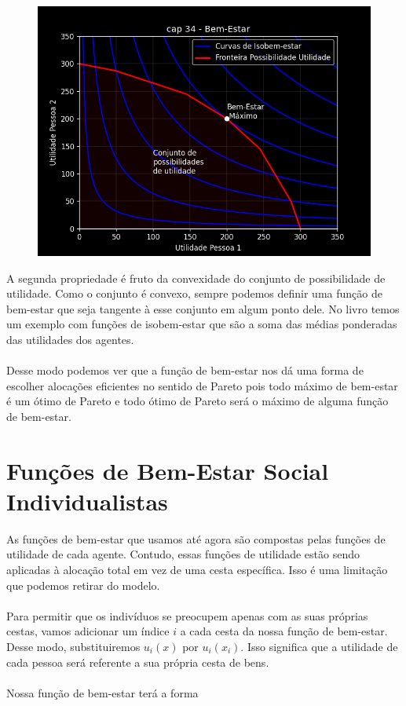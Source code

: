\documentclass[a4paper,11pt,oneside]{book}
\theoremstyle{definition}
\theoremstyle{break}
\begin{document}
\begin{figure}[H]
	\centering
	\includegraphics[scale=0.55]{cap34_3-maximizacao_bem_estar.png}
\end{figure}

A segunda propriedade é fruto da convexidade do conjunto de possibilidade de utilidade. Como o conjunto é convexo, sempre podemos definir uma função de bem-estar que seja tangente à esse conjunto em algum ponto dele. No livro temos um exemplo com funções de isobem-estar que são a soma das médias ponderadas das utilidades dos agentes.
\\
\\
Desse modo podemos ver que a função de bem-estar nos dá uma forma de escolher alocações eficientes no sentido de Pareto pois todo máximo de bem-estar é um ótimo de Pareto e todo ótimo de Pareto será o máximo de alguma função de bem-estar.

\section{Funções de Bem-Estar Social Individualistas}

As funções de bem-estar que usamos até agora são compostas pelas funções de utilidade de cada agente. Contudo, essas funções de utilidade estão sendo aplicadas à alocação total em vez de uma cesta específica. Isso é uma limitação que podemos retirar do modelo.
\\
\\
Para permitir que os indivíduos se preocupem apenas com as suas próprias cestas, vamos adicionar um índice $i$ a cada cesta da nossa função de bem-estar. Desse modo, substituiremos $u_i(x)$ por $u_i(x_i)$. Isso significa que a utilidade de cada pessoa será referente a sua própria cesta de bens.
\\
\\
Nossa função de bem-estar terá a forma
\end{document}
